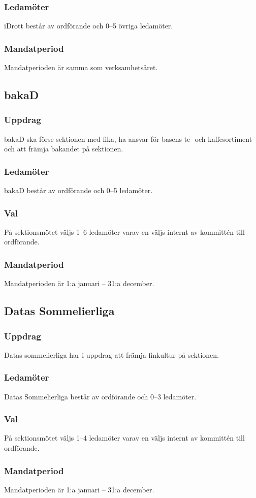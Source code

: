 \subsubsection{Ledamöter}
iDrott består av ordförande och 0--5 övriga ledamöter. 
\subsubsection{Mandatperiod}
Mandatperioden är samma som verksamhetsåret. 

\subsection{bakaD}
\subsubsection{Uppdrag}
bakaD ska förse sektionen med fika, ha ansvar för basens te- och kaffesortiment och att främja bakandet på sektionen.
\subsubsection{Ledamöter}
bakaD består av ordförande och 0--5 ledamöter.
\subsubsection{Val}
På sektionsmötet väljs 1--6 ledamöter varav en väljs internt av kommittén till ordförande.
\subsubsection{Mandatperiod}
Mandatperioden är 1:a januari – 31:a december.

\subsection{Datas Sommelierliga}
\subsubsection{Uppdrag}
Datas sommelierliga har i uppdrag att främja finkultur på sektionen.
\subsubsection{Ledamöter}
Datas Sommelierliga består av ordförande och 0--3 ledamöter.
\subsubsection{Val}
På sektionsmötet väljs 1--4 ledamöter varav en väljs internt av kommittén till ordförande.
\subsubsection{Mandatperiod}
Mandatperioden är 1:a januari – 31:a december.
\newpage
